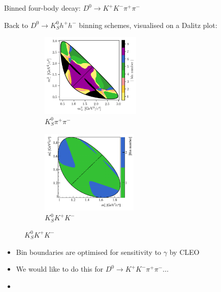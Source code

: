 \documentclass[dvipsnames]{beamer}
\begin{document}
\begin{frame}{Binned four-body decay: $D^0\to K^+K^-\pi^+\pi^-$}
  \begin{center}
    {\large Back to $D^0\to K_S^0h^+h^-$ binning schemes, visualised on a Dalitz plot:}
  \end{center}
  \vspace{-0.3cm}
  \begin{figure}
    \begin{subfigure}{0.45\textwidth}
      \includegraphics[height = 4cm]{Plots/KsPiPi_optimal.png}
      \vspace{-0.3cm}
      \caption*{$K_S^0\pi^+\pi^-$}
    \end{subfigure}%
    \begin{subfigure}{0.45\textwidth}
      \includegraphics[height = 4cm]{Plots/KsKK_binning.png}
      \vspace{-0.3cm}
      \caption*{$K_S^0K^+K^-$}
    \end{subfigure}
  \end{figure}
  \begin{itemize}
    \setlength\itemsep{0.5em}
    \item{Bin boundaries are optimised for sensitivity to $\gamma$ by CLEO}
    \item{We would like to do this for $D^0\to K^+K^-\pi^+\pi^-$...}
    \item[]{\phantom{... but the four-body phase space is five-dimensional!}}
  \end{itemize}
\end{frame}
\end{document}
